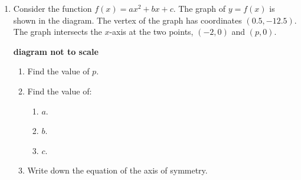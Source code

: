\documentclass[12pt, twoside]{article}
\begin{document}
\begin{enumerate}
    \item Consider the function $f(x)=ax^2 + bx+c$. The graph of $y=f(x)$ is shown in the diagram. The vertex of the graph has coordinates $(0.5, -12.5)$. The graph intersects the $x$-axis at the two points, $(-2,0)$ and $(p,0)$.\\
    \begin{flushright}
        \bf{diagram not to scale}
    \end{flushright}
      \begin{center}
      \end{center}
  
      \begin{enumerate}
          \item Find the value of $p$.
          \item Find the value of:
          \begin{enumerate}
              \item $a$.
              \item $b$.
              \item $c$.
          \end{enumerate}
          \item Write down the equation of the axis of symmetry.
      \end{enumerate}

\newpage


\end{enumerate}
\end{document}
